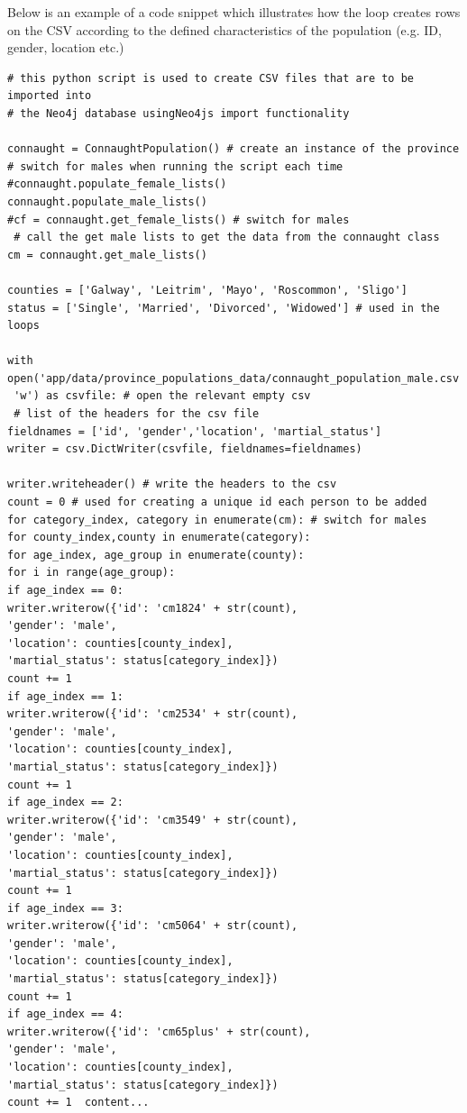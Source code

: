 Below is an example of a code snippet which illustrates how the loop creates rows on the CSV according to the defined characteristics of the population (e.g. ID, gender, location etc.) 
\begin{verbatim}
# this python script is used to create CSV files that are to be imported into
# the Neo4j database usingNeo4js import functionality

connaught = ConnaughtPopulation() # create an instance of the province
# switch for males when running the script each time
#connaught.populate_female_lists() 
connaught.populate_male_lists()
#cf = connaught.get_female_lists() # switch for males
 # call the get male lists to get the data from the connaught class
cm = connaught.get_male_lists()

counties = ['Galway', 'Leitrim', 'Mayo', 'Roscommon', 'Sligo']
status = ['Single', 'Married', 'Divorced', 'Widowed'] # used in the loops

with open('app/data/province_populations_data/connaught_population_male.csv',
 'w') as csvfile: # open the relevant empty csv
 # list of the headers for the csv file
fieldnames = ['id', 'gender','location', 'martial_status'] 
writer = csv.DictWriter(csvfile, fieldnames=fieldnames)

writer.writeheader() # write the headers to the csv
count = 0 # used for creating a unique id each person to be added
for category_index, category in enumerate(cm): # switch for males
for county_index,county in enumerate(category):
for age_index, age_group in enumerate(county):
for i in range(age_group):
if age_index == 0:
writer.writerow({'id': 'cm1824' + str(count),
'gender': 'male',
'location': counties[county_index],
'martial_status': status[category_index]})
count += 1
if age_index == 1:
writer.writerow({'id': 'cm2534' + str(count),
'gender': 'male',
'location': counties[county_index],
'martial_status': status[category_index]})
count += 1
if age_index == 2:
writer.writerow({'id': 'cm3549' + str(count),
'gender': 'male',
'location': counties[county_index],
'martial_status': status[category_index]})
count += 1
if age_index == 3:
writer.writerow({'id': 'cm5064' + str(count),
'gender': 'male',
'location': counties[county_index],
'martial_status': status[category_index]})
count += 1
if age_index == 4:
writer.writerow({'id': 'cm65plus' + str(count),
'gender': 'male',
'location': counties[county_index],
'martial_status': status[category_index]})
count += 1	content...
\end{verbatim}
\pagebreak
